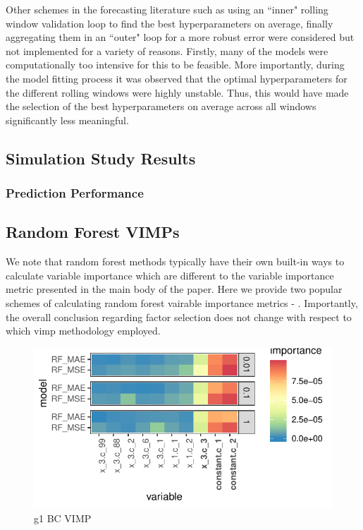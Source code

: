 \documentclass{article}
\begin{document}
Other schemes in the forecasting literature such as using an ``inner" rolling window validation loop to find the best hyperparameters on average, finally aggregating them in an ``outer" loop for a more robust error were considered but not implemented for a variety of reasons. Firstly, many of the models were computationally too intensive for this to be feasible. More importantly, during the model fitting process it was observed that the optimal hyperparameters for the different rolling windows were highly unstable. Thus, this would have made the selection of the best hyperparameters on average across all windows significantly less meaningful.

\subsection{Simulation Study Results}

\subsubsection{Prediction Performance}



\subsection{Random Forest VIMPs}

We note that random forest methods typically have their own built-in ways to calculate variable importance which are different to the variable importance metric presented in the main body of the paper. Here we provide two popular schemes of calculating random forest vairable importance metrics - . Importantly, the overall conclusion regarding factor selection does not change with respect to which vimp methodology employed.

\begin{figure}
	\includegraphics[]{../../Results/simulation/graphics/simulation_g1_vimp_bc.pdf}
	\caption{g1 BC VIMP}
\end{figure}
\end{document}
